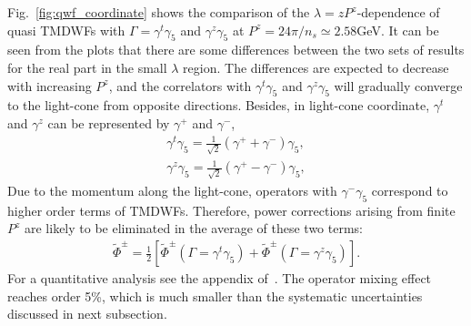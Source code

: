 \documentclass[prd,aps,twocolumn,preprintnumbers, showpacs, nofootinbib,superscriptaddress,notitlepage]{revtex4-1}
\newcommand\bl{\color{blue}}
\begin{document}
Fig.~\ref{fig:qwf_coordinate} shows the comparison of the $\lambda= z   P^z$-dependence of quasi TMDWFs with $\Gamma=\gamma^t\gamma_5$ and $\gamma^z\gamma_5$ at $P^z=24\pi/n_s\simeq2.58$GeV. It can be seen from the plots that there are some differences between the two sets of results for the real part in  the small $\lambda$ region. The differences are expected to decrease with {\bl increasing $P^z$}, and the {\bl correlators} with $\gamma^t\gamma_5$ and $\gamma^z\gamma_5$ will gradually converge to the light-cone from opposite {\bl directions}. Besides, in light-cone coordinate, $\gamma^t$ and $\gamma^z$ can be represented by $\gamma^+$ and $\gamma^-$,
\begin{align}
\gamma^t\gamma_5=\frac{1}{\sqrt{2}}(\gamma^++\gamma^-)\gamma_5,\nonumber\\
\gamma^z\gamma_5=\frac{1}{\sqrt{2}}(\gamma^+-\gamma^-)\gamma_5,
\end{align}
Due to the momentum along the light-cone, {\bl operators} with $\gamma^-\gamma_5$ {\bl correspond to higher order terms} of TMDWFs. Therefore, power corrections {\bl arising} from finite $P^z$ are likely to be eliminated in the average of these two terms:
\begin{align}
\tilde{\Phi}^{\pm}=\frac{1}{2}\left[\tilde{\Phi}^{\pm}\left(\Gamma=\gamma^t\gamma_5\right) + \tilde{\Phi}^{\pm}\left(\Gamma=\gamma^z\gamma_5\right)\right].
\end{align}
{\bl For a quantitative analysis see the appendix of~\cite{LatticeParton:2020uhz}. The} operator mixing effect {\bl reaches order 5\%, which is} much smaller than the systematic uncertainties discussed in next subsection. 
\end{document}
